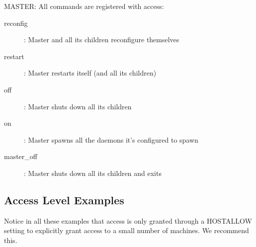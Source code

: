 MASTER:  All commands are registered with 
access:

\begin{description}
\item[reconfig] : Master and all its children reconfigure themselves
\item[restart] : Master restarts itself (and all its children)	
\item[off] : Master shuts down all its children
\item[on] : Master spawns all the daemons it's configured to spawn
\item[master\_off] : Master shuts down all its children and exits
\end{description}


\subsection{\label{sec:DCPerm-Examples}Access Level Examples}

Notice in all these examples that  access is
only granted through a HOSTALLOW setting to explicitly grant access to
a small number of machines.  We recommend this.

